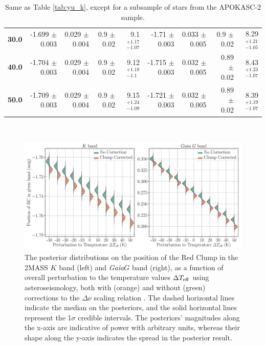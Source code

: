 \documentclass[fleqn,usenatbib]{mnras}
\newcommand{\dnu}{\mbox{$\Delta \nu$}\xspace}
\newcommand{\gaia}{\emph{Gaia}\xspace}
\newcommand{\Ks}{\mbox{$K$}\xspace}
\newcommand{\nnew}[1]{#1}
\begin{document}
\begin{table}
\begin{tabular}{rrrrr|rrrr}
        \textbf{30.0 } & -1.699 $\pm$ 0.003 &  0.029 $\pm$ 0.004 &  0.9 $\pm$ 0.02 &   9.1$_{-1.07}^{+1.17}$    &   -1.71 $\pm$ 0.003 &   0.033 $\pm$ 0.005 &   0.9 $\pm$ 0.02 &   8.29$_{-1.05}^{+1.21}$   \\
        \textbf{40.0 } & -1.704 $\pm$ 0.003 &  0.029 $\pm$ 0.004 &  0.9 $\pm$ 0.02 &  9.12$_{- 1.1}^{+1.18}$    &  -1.715 $\pm$ 0.003 &   0.032 $\pm$ 0.005 &  0.89 $\pm$ 0.02 &   8.43$_{-1.07}^{+1.23}$    \\
        \textbf{50.0 } & -1.709 $\pm$ 0.003 &  0.029 $\pm$ 0.004 &  0.9 $\pm$ 0.02 &  9.15$_{-1.09}^{+1.24}$    &  -1.721 $\pm$ 0.003 &   0.032 $\pm$ 0.005 &  0.89 $\pm$ 0.02 &   8.39$_{-1.07}^{+1.19}$   \\
    \bottomrule
    \end{tabular} \\
\caption{Same as Table \ref{tab:yu_k}, except for a subsample of stars from the APOKASC-2 \citep{art:pinsonneault+2018} sample.}
\label{tab:apo_k}
\end{table}



\begin{figure}
    \centering
    \includegraphics[width=\textwidth]{yu_posteriors.pdf}
    \caption{The posterior distributions on the position of the Red Clump in the 2MASS \Ks band (left) and \gaia $G$ band (right), as a function of overall perturbation to the temperature values $\Delta T_{\rm eff}$ using asteroseismology, both with (orange) and without (green) corrections to the \dnu scaling relation \citep{art:sharma+2016}. The dashed horizontal lines indicate the median on the posteriors, and the solid horizontal lines represent \nnew{the 1$\sigma$ credible intervals}. The posteriors' magnitudes along the x-axis are indicative of power with arbitrary units, whereas their shape along the y-axis indicates the spread in the posterior result.}
    \label{fig:yu_posteriors}
\end{figure}
\end{document}

